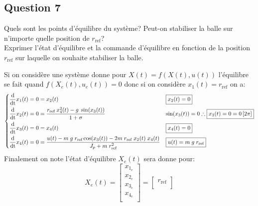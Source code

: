 \documentclass[class=article, crop=false]{standalone}
\begin{document}
\subsection{Question 7}
\begin{exercise}
    Quels sont les points d'équilibre du système? Peut-on stabiliser la balle sur n'importe quelle position de $r_{\text{ref}}$?\\
    
Exprimer l'état d'équilibre et la commande d'équilibre en fonction de la position $r_{\text{ref}}$ sur laquelle on souhaite stabiliser la balle.
\end{exercise}
\begin{resolution}
    Si on considère une système donne pour $X(t) = f(X(t), u(t))$ l'équilibre se fait quand $f(X_e(t), u_e(t)) = 0$ donc si on considère $x_1(t) = r_{\text{ref}}$ on a:
    \begin{equation*}
        \begin{dcases}
            \frac{\text{d}}{\text{dt}} x_1(t) = 0 = x_2(t) & 
            \boxed{x_2(t) = 0}
            \\
            \frac{\text{d}}{\text{dt}} x_2(t) = 0 = \frac{ r_{\text{ref}} \; x^2_4(t) - g \; \sin(x_3(t))}{1 + \sigma} & 
            \sin(x_3(t)) = 0 \therefore \boxed{x_3(t) = 0 = 0\,[2\pi]}
            \\
            \frac{\text{d}}{\text{dt}} x_3(t) = 0 = x_4(t) & 
            \boxed{x_4(t) = 0}
            \\
            \frac{\text{d}}{\text{dt}} x_4(t) = 0 = \frac{u(t) - m \; g \; r_{\text{ref}} \cos(x_3(t)) - 2 m \; r_{\text{ref}} \; x_2(t) \; x_4(t)}{J_p + m \; r_{\text{ref}}^2} & 
            \boxed{u(t) = m \; g \; r_{\text{ref}}}
            \\
        \end{dcases}
    \end{equation*}
    Finalement on note l'état d'équilibre $X_e(t)$ sera donne pour:
    \begin{equation}
        X_e(t) = 
        \begin{bmatrix}
            x_{1_e}\\
            x_{2_e}\\
            x_{3_e}\\
            x_{4_e}\\
        \end{bmatrix}
        =
        \begin{bmatrix}
            r_{\text{ref}}\\

\end{bmatrix}
\end{equation}
\end{resolution}
\end{document}
